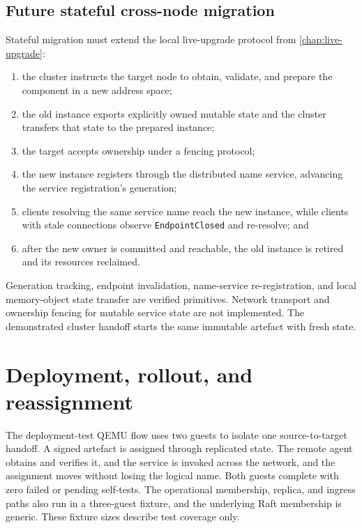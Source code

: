 \subsection{Future stateful cross-node migration}

Stateful migration must extend the local live-upgrade protocol from
\autoref{chap:live-upgrade}:

\begin{enumerate}
    \item the cluster instructs the target node to obtain, validate, and
        prepare the component in a new address space;
    \item the old instance exports explicitly owned mutable state and the
        cluster transfers that state to the prepared instance;
    \item the target accepts ownership under a fencing protocol;
    \item the new instance registers through the distributed name service,
        advancing the service registration's generation;
    \item clients resolving the same service name reach the new instance, while
        clients with stale connections observe \texttt{EndpointClosed} and
        re-resolve; and
    \item after the new owner is committed and reachable, the old instance is
        retired and its resources reclaimed.
\end{enumerate}

Generation tracking, endpoint invalidation, name-service re-registration,
and local memory-object state transfer are verified primitives. Network
transport and ownership fencing for mutable service state are not
implemented. The demonstrated cluster handoff starts the same immutable
artefact with fresh state.

\section{Deployment, rollout, and reassignment}

The deployment-test QEMU flow uses two guests to isolate one source-to-target
handoff. A signed artefact is assigned through replicated state. The remote
agent obtains and verifies it, and the service is invoked across the network, and
the assignment moves without losing the logical name. Both guests complete
with zero failed or pending self-tests. The operational membership, replica,
and ingress paths also run in a three-guest fixture, and the underlying Raft
membership is generic. These fixture sizes describe test coverage only.

